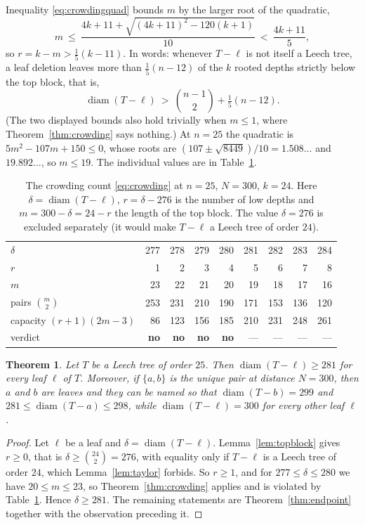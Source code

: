 \documentclass[11pt,a4paper]{article}
\theoremstyle{plain}
\newtheorem{theorem}{Theorem}[section]
\theoremstyle{remark}
\newcommand{\bin}[2]{\binom{#1}{#2}}
\newcommand{\diam}{\operatorname{diam}}
\begin{document}
Inequality \eqref{eq:crowdingquad} bounds $m$ by the larger root of the
quadratic,
\[
  m\ \le\ \frac{4k+11+\sqrt{(4k+11)^2-120(k+1)}}{10}\ <\ \frac{4k+11}{5},
\]
so $r=k-m>\tfrac15(k-11)$.  In words: whenever $T-\ell$ is not itself a Leech
tree, a leaf deletion leaves more than $\tfrac15(n-12)$ of the $k$ rooted depths
strictly below the top block, that is,
\[
  \diam(T-\ell)\ >\ \bin{n-1}2+\tfrac15(n-12).
\]
(The two displayed bounds also hold trivially when $m\le1$, where
Theorem~\ref{thm:crowding} says nothing.)  At $n=25$ the quadratic is
$5m^2-107m+150\le0$, whose roots
are $(107\pm\sqrt{8449})/10=1.508\ldots$ and $19.892\ldots$, so $m\le19$.  The
individual values are in Table~\ref{tab:crowdcount}.

\begin{table}[ht]
\centering
\caption{The crowding count \eqref{eq:crowding} at $n=25$, $N=300$, $k=24$.
Here $\delta=\diam(T-\ell)$, $r=\delta-276$ is the number of low depths and
$m=300-\delta=24-r$ the length of the top block.  The value $\delta=276$ is
excluded separately (it would make $T-\ell$ a Leech tree of order $24$).}
\label{tab:crowdcount}
\small
\begin{tabular}{@{}l*{8}{r}@{}}
\toprule
$\delta$              & 277 & 278 & 279 & 280 & 281 & 282 & 283 & 284\\
$r$                   & 1 & 2 & 3 & 4 & 5 & 6 & 7 & 8\\
$m$                   & 23 & 22 & 21 & 20 & 19 & 18 & 17 & 16\\
\midrule
pairs $\bin m2$       & 253 & 231 & 210 & 190 & 171 & 153 & 136 & 120\\
capacity $(r+1)(2m-3)$& 86 & 123 & 156 & 185 & 210 & 231 & 248 & 261\\
\midrule
verdict               & \textbf{no} & \textbf{no} & \textbf{no} & \textbf{no} & --- & --- & --- & ---\\
\bottomrule
\end{tabular}
\end{table}

\begin{theorem}\label{thm:crowd280}
Let $T$ be a Leech tree of order $25$.  Then $\diam(T-\ell)\ge281$ for every
leaf $\ell$ of $T$.  Moreover, if $\{a,b\}$ is the unique pair at distance
$N=300$, then $a$ and $b$ are leaves and they can be named so that
$\diam(T-b)=299$ and $281\le\diam(T-a)\le298$, while $\diam(T-\ell)=300$ for
every other leaf $\ell$.
\end{theorem}

\begin{proof}
Let $\ell$ be a leaf and $\delta=\diam(T-\ell)$.  Lemma~\ref{lem:topblock}
gives $r\ge0$, that is $\delta\ge\bin{24}2=276$, with equality only if $T-\ell$
is a Leech tree of order $24$, which Lemma~\ref{lem:taylor} forbids.  So
$r\ge1$, and for
$277\le\delta\le280$ we have $20\le m\le23$, so Theorem~\ref{thm:crowding}
applies and is violated by Table~\ref{tab:crowdcount}.  Hence $\delta\ge281$.
The remaining statements are Theorem~\ref{thm:endpoint} together with the
observation preceding it.
\end{proof}
\end{document}
